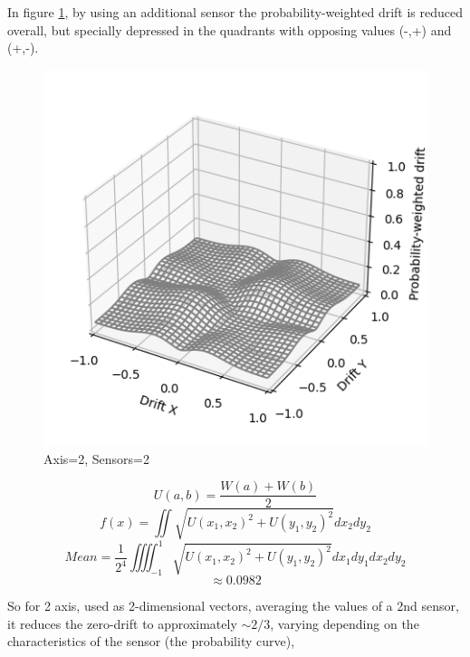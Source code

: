 \documentclass[10pt, twocolumn, a4paper]{article}
\begin{document}
            In figure \ref{fig_zero_22}, by using an additional sensor the probability-weighted drift is reduced overall, but specially depressed in the quadrants with opposing values (-,+) and (+,-).
            \begin{figure}[H]
                \begin{center}
                    \caption{Axis=2, Sensors=2}
                    \label{fig_zero_22}
                    \includegraphics[width=0.8\linewidth]{figure_drift_4.png}
                \end{center}
            \end{figure}
            \vspace{-8mm}
            $$ U(a, b) = \frac{W(a)+W(b)}{2} $$
            $$
                f(x) = \iint \sqrt{
                    U(x_1, x_2)^2 +
                    U(y_1, y_2)^2
                } dx_2 dy_2
            $$
            $$
                Mean = \frac{1}{2^4} \iiiint_{-1}^1 \sqrt{
                    U(x_1, x_2)^2 +
                    U(y_1, y_2)^2
                } dx_1 dy_1 dx_2 dy_2
            $$
            $$ \approx 0.0982 $$

            \pagebreak
            So for 2 axis, used as 2-dimensional vectors, averaging the values of a 2nd sensor, it reduces the zero-drift to approximately $ \sim 2/3 $, varying depending on the characteristics of the sensor (the probability curve),
\end{document}
